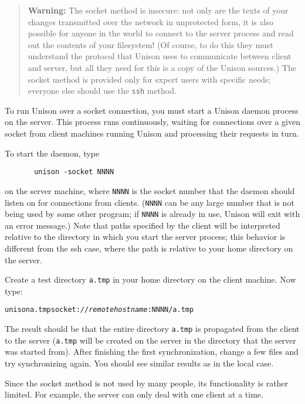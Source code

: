 \documentclass{article}
\newcommand{\NT}[1]{\textit{#1}}
\begin{document}

\begin{quote}
  {\bf\ifhevea\red\fi Warning:} The socket method is
  insecure: not only are the texts of your changes transmitted over
  the network in unprotected form, it is also possible for anyone in
  the world to connect to the server process and read out the contents
  of your filesystem!  (Of course, to do this they must understand the
  protocol that Unison uses to communicate between client and server,
  but all they need for this is a copy of the Unison sources.)  The socket
  method is provided only for expert users with specific needs; everyone
  else should use the \verb|ssh| method.
\end{quote}

To run Unison over a socket connection, you must start a Unison
daemon process on the server.  This process runs continuously,
waiting for connections over a given socket from client machines
running Unison and processing their requests in turn.

To start the daemon, type
\begin{verbatim}
       unison -socket NNNN
\end{verbatim}
on the server machine, where {\tt NNNN} is the socket number that the
daemon should listen on for connections from clients.  ({\tt NNNN} can
be any large number that is not being used by some other program; if
\texttt{NNNN} is already in use, Unison will exit with an error
message.)  Note that paths specified by the client will be interpreted
relative to the directory in which you start the server process; this
behavior is different from the ssh case, where the path is relative to
your home directory on the server.

Create a test directory {\tt a.tmp} in your home directory on the
client machine.  Now type:
\begin{alltt}
       unison a.tmp socket://\NT{remotehostname}:NNNN/a.tmp
\end{alltt}
The result should be that the entire directory {\tt a.tmp} is
propagated from the client to the server (\texttt{a.tmp} will be
created on the server in the directory that the server was started
from).
%
After finishing the first synchronization, change a few files and try
synchronizing again.  You should see similar results as in the local
case.

Since the socket method is not used by many people, its functionality is
rather limited.  For example, the server can only deal with one client at a
time.
\end{document}
